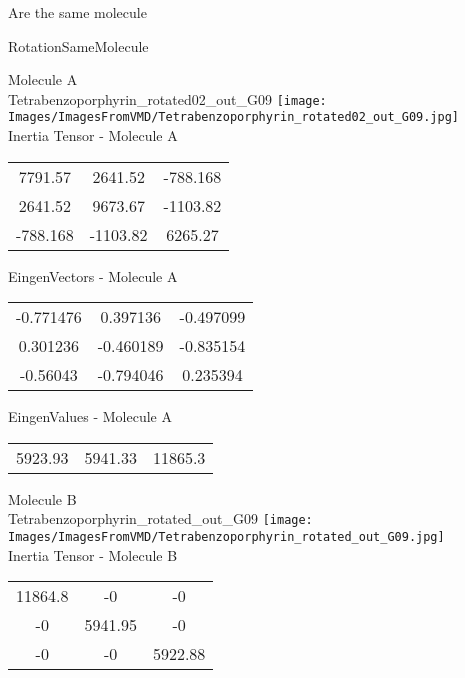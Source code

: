 \begin{center}
\vtab
\vtab
\textcolor{NavyBlue}{\Large Are the same molecule}
\end{center}
\newpage

\vtab[-2cm]
\begin{center}
{\large RotationSameMolecule}
\end{center}
\begin{multicols}{2}
\begin{center}
Molecule A \\ 
Tetrabenzoporphyrin\_rotated02\_out\_G09
\texttt{[image: Images/ImagesFromVMD/Tetrabenzoporphyrin\_rotated02\_out\_G09.jpg]}
\\
Inertia Tensor - Molecule A \\
\vtab
\begin{tabular}{|c c c|}
7791.57	 & 	2641.52	 & 	-788.168	 \\
2641.52	 & 	9673.67	 & 	-1103.82	 \\
-788.168	 & 	-1103.82	 & 	6265.27
\end{tabular}

\vtab
 EingenVectors - Molecule A     \\
\vtab
\begin{tabular}{|c c c|}
-0.771476	 & 	0.397136	 & 	-0.497099	 \\
0.301236	 & 	-0.460189	 & 	-0.835154	 \\
-0.56043	 & 	-0.794046	 & 	0.235394
\end{tabular}

\vtab
 EingenValues - Molecule A     \\
\vtab
\begin{tabular}{|c c c|}
5923.93	 & 	5941.33	 & 	11865.3
\end{tabular}
\columnbreak

Molecule B \\ 
Tetrabenzoporphyrin\_rotated\_out\_G09
\texttt{[image: Images/ImagesFromVMD/Tetrabenzoporphyrin\_rotated\_out\_G09.jpg]}
\\
Inertia Tensor - Molecule B \\
\vtab
\begin{tabular}{|c c c|}
11864.8	 & 	-0	 & 	-0	 \\
-0	 & 	5941.95	 & 	-0	 \\
-0	 & 	-0	 & 	5922.88
\end{tabular}


\end{center}
\end{multicols}
